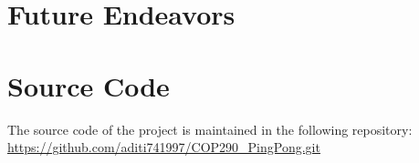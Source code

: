 \documentclass{article}
\begin{document}
	\section{Future Endeavors}

	\section{Source Code}
	The source code of the project is maintained in the following repository: \\
	\url{https://github.com/aditi741997/COP290_PingPong.git}
	
	\medskip
	
\end{document}
